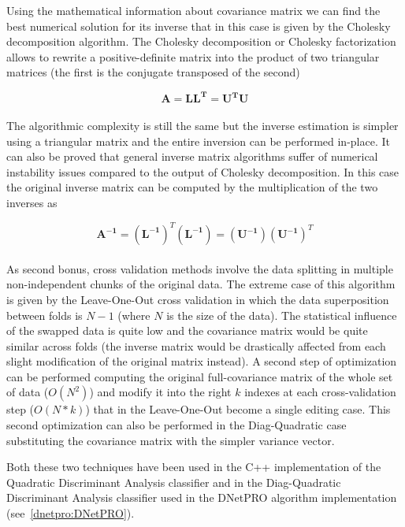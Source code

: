 \documentclass{standalone}
\begin{document}
Using the mathematical information about covariance matrix we can find the best numerical solution for its inverse that in this case is given by the Cholesky decomposition algorithm.
The Cholesky decomposition or Cholesky factorization allows to rewrite a positive-definite matrix into the product of two triangular matrices (the first is the conjugate transposed of the second)

$$
\mathbf{A} = \mathbf{LL^T} = \mathbf{U^TU}
$$
\\
The algorithmic complexity is still the same but the inverse estimation is simpler using a triangular matrix and the entire inversion can be performed in-place.
It can also be proved that general inverse matrix algorithms suffer of numerical instability issues compared to the output of Cholesky decomposition.
In this case the original inverse matrix can be computed by the multiplication of the two inverses as

$$
\mathbf{A^{-1}} = (\mathbf{L^{-1}})^T(\mathbf{L^{-1}}) = (\mathbf{U^{-1}})(\mathbf{U^{-1}})^T
$$
\\
As second bonus, cross validation methods involve the data splitting in multiple non-independent chunks of the original data.
The extreme case of this algorithm is given by the Leave-One-Out cross validation in which the data superposition between folds is $N-1$ (where $N$ is the size of the data).
The statistical influence of the swapped data is quite low and the covariance matrix would be quite similar across folds (the inverse matrix would be drastically affected from each slight modification of the original matrix instead).
A second step of optimization can be performed computing the original full-covariance matrix of the whole set of data ($O(N^2)$) and modify it into the right $k$ indexes at each cross-validation step ($O(N*k)$) that in the Leave-One-Out become a single editing case.
This second optimization  can also be performed in the Diag-Quadratic case substituting the covariance matrix with the simpler variance vector.


Both these two techniques have been used in the \textsf{C++} implementation of the Quadratic Discriminant Analysis classifier and in the Diag-Quadratic Discriminant Analysis classifier used in the \textsf{DNetPRO} algorithm implementation (see~\ref{dnetpro:DNetPRO}).
\end{document}
